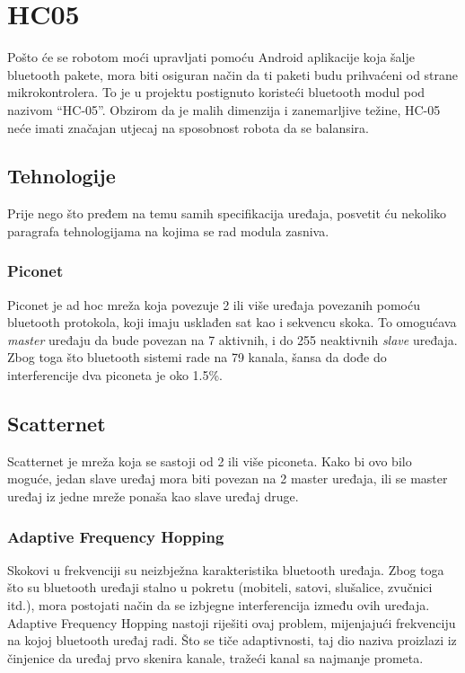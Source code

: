 \documentclass[../Document.tex]{subfiles}
\begin{document}
\section{HC05}
Pošto će se robotom moći upravljati pomoću Android aplikacije koja šalje bluetooth pakete, mora biti osiguran način da ti paketi budu prihvaćeni od strane mikrokontrolera. To je u projektu postignuto koristeći bluetooth modul pod nazivom ``HC-05''. Obzirom da je malih dimenzija i zanemarljive težine, HC-05 neće imati značajan utjecaj na sposobnost robota da se balansira.

\subsection{Tehnologije}
Prije nego što pređem na temu samih specifikacija uređaja, posvetit ću nekoliko paragrafa tehnologijama na kojima se rad modula zasniva.

\subsubsection{Piconet}
Piconet je ad hoc mreža koja povezuje 2 ili više uređaja povezanih pomoću bluetooth protokola, koji imaju usklađen sat kao i sekvencu skoka. To omogućava \textit{master} uređaju da bude povezan na 7 aktivnih, i do 255 neaktivnih \textit{slave} uređaja. Zbog toga što bluetooth sistemi rade na 79 kanala, šansa da dođe do interferencije dva piconeta je oko 1.5\%.
\vspace{1cm}

\subsection{Scatternet}
Scatternet je mreža koja se sastoji od 2 ili više piconeta. Kako bi ovo bilo moguće, jedan slave uređaj mora biti povezan na 2 master uređaja, ili se master uređaj iz jedne mreže ponaša kao slave uređaj druge.

\subsubsection{Adaptive Frequency Hopping}
Skokovi u frekvenciji su neizbježna karakteristika bluetooth uređaja. Zbog toga što su bluetooth uređaji stalno u pokretu (mobiteli, satovi, slušalice, zvučnici itd.), mora postojati način da se izbjegne interferencija između ovih uređaja. Adaptive Frequency Hopping nastoji riješiti ovaj problem, mijenjajući frekvenciju na kojoj bluetooth uređaj radi. Što se tiče adaptivnosti, taj dio naziva proizlazi iz činjenice da uređaj prvo skenira kanale, tražeći kanal sa najmanje prometa.
\end{document}
